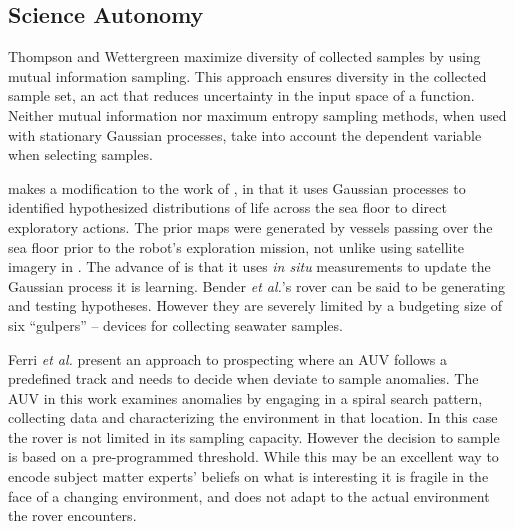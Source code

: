\subsection{Science Autonomy}


Thompson and Wettergreen \cite{thompson2008intelligent} maximize diversity of
collected samples by using mutual information sampling.  This approach ensures
diversity in the collected sample set, an act that reduces uncertainty in the
input space of a function.  Neither mutual information nor maximum entropy
sampling methods, when used with stationary Gaussian processes, take into
account the dependent variable when selecting samples.  


\cite{bender2013autonomous} makes a modification to the work of
\cite{thompson2008intelligent}, in that it uses Gaussian processes to
identified hypothesized distributions of life across the sea floor to direct
exploratory actions.  The prior maps were generated by vessels passing over the
sea floor prior to the robot's exploration mission, not unlike using satellite
imagery in \cite{thompson2008intelligent}.  The advance of
\cite{bender2013autonomous} is that it uses \emph{in situ} measurements to
update the Gaussian process it is learning.  Bender \emph{et al.}'s rover can
be said to be generating and testing hypotheses.  However they are severely
limited by a budgeting size of six ``gulpers'' -- devices for collecting
seawater samples.


Ferri \emph{et al.} \cite{ferri2010novel} present an approach to prospecting where an AUV follows a predefined track and needs to decide when deviate to sample anomalies.  The AUV in this work examines anomalies by engaging in a spiral search pattern, collecting data and characterizing the environment in that location.  In this case the rover is not limited in its sampling capacity.  However the decision to sample is based on a pre-programmed threshold.  While this may be an excellent way to encode subject matter experts' beliefs on what is interesting it is fragile in the face of a changing environment, and does not adapt to the actual environment the rover encounters.
 
